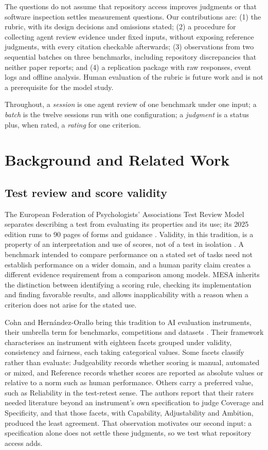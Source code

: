 \documentclass[10pt,conference]{IEEEtran}
\begin{document}
The questions do not assume that repository access improves judgments or that software inspection settles measurement questions. Our contributions are: (1) the rubric, with its design decisions and omissions stated; (2) a procedure for collecting agent review evidence under fixed inputs, without exposing reference judgments, with every citation checkable afterwards; (3) observations from two sequential batches on three benchmarks, including repository discrepancies that neither paper reports; and (4) a replication package with raw responses, event logs and offline analysis. Human evaluation of the rubric is future work and is not a prerequisite for the model study.

Throughout, a \emph{session} is one agent review of one benchmark under one input; a \emph{batch} is the twelve sessions run with one configuration; a \emph{judgment} is a status plus, when rated, a \emph{rating} for one criterion.

\section{Background and Related Work}
\subsection{Test review and score validity}
The European Federation of Psychologists' Associations Test Review Model separates describing a test from evaluating its properties and its use; its 2025 edition runs to 90 pages of forms and guidance \cite{efpa_test_review_model_2025}. Validity, in this tradition, is a property of an interpretation and use of scores, not of a test in isolation \cite{kane_validation,aera_apa_ncme_standards_2014}. A benchmark intended to compare performance on a stated set of tasks need not establish performance on a wider domain, and a human parity claim creates a different evidence requirement from a comparison among models. MESA inherits the distinction between identifying a scoring rule, checking its implementation and finding favorable results, and allows inapplicability with a reason when a criterion does not arise for the stated use.

Cohn and Hernández-Orallo bring this tradition to AI evaluation instruments, their umbrella term for benchmarks, competitions and datasets \cite{cohn_hernandez_orallo_oecd_2023}. Their framework characterises an instrument with eighteen facets grouped under validity, consistency and fairness, each taking categorical values. Some facets classify rather than evaluate: Judgeability records whether scoring is manual, automated or mixed, and Reference records whether scores are reported as absolute values or relative to a norm such as human performance. Others carry a preferred value, such as Reliability in the test-retest sense. The authors report that their raters needed literature beyond an instrument's own specification to judge Coverage and Specificity, and that those facets, with Capability, Adjustability and Ambition, produced the least agreement. That observation motivates our second input: a specification alone does not settle these judgments, so we test what repository access adds.
\end{document}
